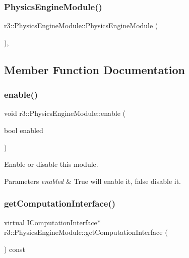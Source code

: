 \subsubsection{\texorpdfstring{Physics\+Engine\+Module()}{PhysicsEngineModule()}}
{\footnotesize\ttfamily r3\+::\+Physics\+Engine\+Module\+::\+Physics\+Engine\+Module (\begin{DoxyParamCaption}{ }\end{DoxyParamCaption})\hspace{0.3cm}{\ttfamily [explicit]}, {\ttfamily [protected]}}



\subsection{Member Function Documentation}
\mbox{\label{classr3_1_1_physics_engine_module_abaaace8d25ea23ed21ade61ca2b201d0}} 
\subsubsection{\texorpdfstring{enable()}{enable()}}
{\footnotesize\ttfamily void r3\+::\+Physics\+Engine\+Module\+::enable (\begin{DoxyParamCaption}\item[{bool}]{enabled }\end{DoxyParamCaption})}



Enable or disable this module. 


\begin{DoxyParams}{Parameters}
{\em enabled} & True will enable it, false disable it. \\
\hline
\end{DoxyParams}
\mbox{\label{classr3_1_1_physics_engine_module_a3b1d0d9bea0a82534f367f6d728312d3}} 
\subsubsection{\texorpdfstring{get\+Computation\+Interface()}{getComputationInterface()}}
{\footnotesize\ttfamily virtual \mbox{\hyperlink{classr3_1_1_i_computation_interface}{I\+Computation\+Interface}}$\ast$ r3\+::\+Physics\+Engine\+Module\+::get\+Computation\+Interface (\begin{DoxyParamCaption}{ }\end{DoxyParamCaption}) const\hspace{0.3cm}{\ttfamily [pure virtual]}}



